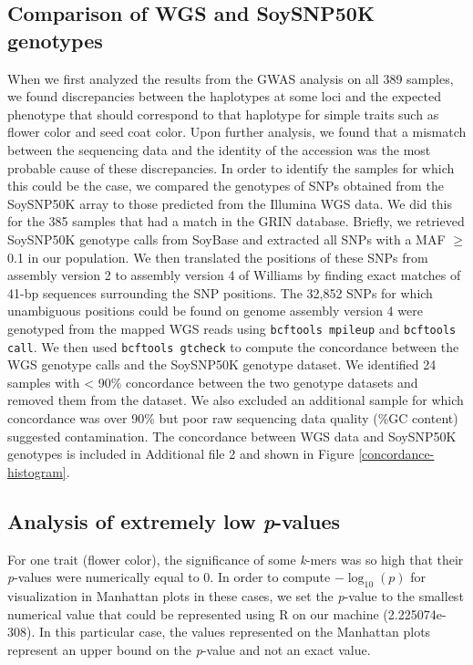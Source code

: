 \subsection*{Comparison of WGS and SoySNP50K genotypes}
\label{annexe-sv-gwas-soysnp50k}
When we first analyzed the results from the GWAS analysis on all 389 samples,
we found discrepancies between the haplotypes at some loci and the expected
phenotype that should correspond to that haplotype for simple traits such as
flower color and seed coat color. Upon further analysis, we found that a
mismatch between the sequencing data and the identity of the accession was the
most probable cause of these discrepancies. In order to identify the samples
for which this could be the case, we compared the genotypes of SNPs obtained
from the SoySNP50K array \cite{song2013} to those predicted from the Illumina WGS
data. We did this for the 385 samples that had a match in the GRIN database. Briefly, we
retrieved SoySNP50K genotype calls from SoyBase \citep{grant2010} and extracted
all SNPs with a MAF $\geq$ 0.1 in our population. We then translated the positions
of these SNPs from assembly version 2 to assembly version 4 of Williams by
finding exact matches of 41-bp sequences surrounding the SNP positions. The
32,852 SNPs for which unambiguous positions could be found on genome assembly
version 4 were genotyped from the mapped WGS reads using \texttt{bcftools
mpileup} and \texttt{bcftools call}. We then used \texttt{bcftools gtcheck} to
compute the concordance between the WGS genotype calls and the
SoySNP50K genotype dataset. We identified 24 samples
with < 90\% concordance between the two genotype datasets and removed them from
the dataset. We also excluded an additional sample for which concordance was over 90\%
but poor raw sequencing data quality (\%GC content) suggested contamination.
The concordance between WGS data and SoySNP50K genotypes is included in
Additional file 2 and shown in Figure \ref{concordance-histogram}.

\subsection*{Analysis of extremely low \textit{p}-values}
\label{annexe-sv-gwas-pvalues}

For one trait (flower color), the significance of some \emph{k}-mers was so
high that their \emph{p}-values were numerically equal to 0. In order to
compute $-\log_{10} (p)$ for visualization in Manhattan plots in these cases,
we set the \emph{p}-value to the smallest numerical value that could be
represented using R on our machine (2.225074e-308). In this particular case,
the values represented on the Manhattan plots represent an upper bound on the
\emph{p}-value and not an exact value.

